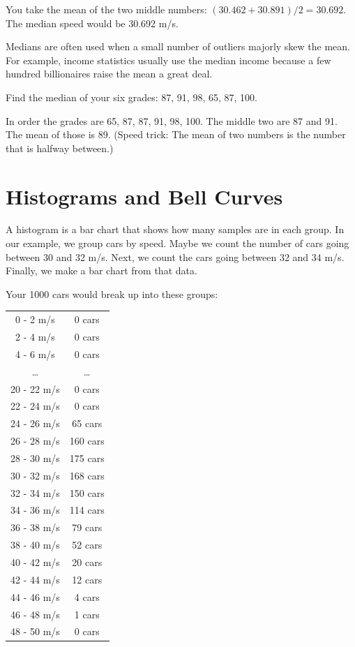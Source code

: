 You take the mean of the two middle numbers: $(30.462 + 30.891)/2 =
30.692$. The median speed would be 30.692 m/s.

Medians are often used when a small number of outliers majorly skew the
mean. For example, income statistics usually use the median income
because a few hundred billionaires raise the mean a great deal.

\begin{Exercise}[title={Median Grade}, label=grades_median]

  Find the median of your six grades: 87, 91, 98, 65, 87, 100.

\end{Exercise}
\begin{Answer}[ref=grades_median]

  In order the grades are 65, 87, 87, 91, 98, 100.  The middle two are 87
  and 91. The mean of those is 89. (Speed trick: The mean of two numbers is the
  number that is halfway between.)
  
 \end{Answer}


\section{Histograms and Bell Curves}

A histogram is a bar chart that shows how many samples are in each
group. In our example, we group cars by speed. Maybe we count the
number of cars going between 30 and 32 m/s. Next, we count the
cars going between 32 and 34 m/s. Finally, we make a bar chart from
that data.


Your 1000 cars would break up into these groups:

\begin{tabular}{ c | c }
0 - 2 m/s & 0 cars \\
2 - 4 m/s & 0 cars \\
4 - 6 m/s & 0 cars \\
\ldots & \ldots \\
20 - 22 m/s & 0 cars \\
22 - 24 m/s & 0 cars \\
24 - 26 m/s & 65 cars \\
26 - 28 m/s & 160 cars \\
28 - 30 m/s & 175 cars \\
30 - 32 m/s & 168 cars \\
32 - 34 m/s & 150 cars \\
34 - 36 m/s & 114 cars \\
36 - 38 m/s & 79 cars \\
38 - 40 m/s & 52 cars \\
40 - 42 m/s & 20 cars \\
42 - 44 m/s & 12 cars \\
44 - 46 m/s & 4 cars \\
46 - 48 m/s & 1 cars \\
48 - 50 m/s & 0 cars \\
\end{tabular}

